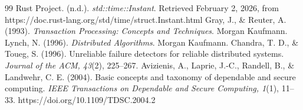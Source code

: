 \documentclass[11pt]{article}
\begin{document}
\begin{thebibliography}{99}
 Rust Project. (n.d.). \textit{std::time::Instant}. Retrieved February 2, 2026, from https://doc.rust-lang.org/std/time/struct.Instant.html
 Gray, J., \& Reuter, A. (1993). \textit{Transaction Processing: Concepts and Techniques}. Morgan Kaufmann.
 Lynch, N. (1996). \textit{Distributed Algorithms}. Morgan Kaufmann.
 Chandra, T. D., \& Toueg, S. (1996). Unreliable failure detectors for reliable distributed systems. \textit{Journal of the ACM, 43}(2), 225--267.
 Avizienis, A., Laprie, J.-C., Randell, B., \& Landwehr, C. E. (2004). Basic concepts and taxonomy of dependable and secure computing. \textit{IEEE Transactions on Dependable and Secure Computing, 1}(1), 11--33. https://doi.org/10.1109/TDSC.2004.2
\end{thebibliography}
\end{document}
